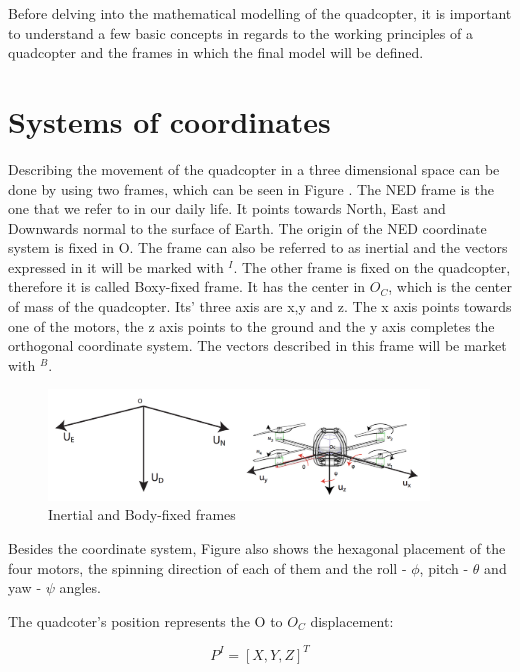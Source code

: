 Before delving into the mathematical modelling of the quadcopter, it is important to understand a few basic concepts in regards to the working principles of a quadcopter and the frames in which the final model will be defined.

\section{Systems of coordinates} \label{2.1} 
Describing the movement of the quadcopter in a three dimensional space can be done by using two frames, which can be seen in Figure \label{frames1}. The NED frame is the one that we refer to in our daily life. It points towards North, East and Downwards normal to the surface of Earth. The origin of the NED coordinate system is fixed in O. The frame can also be referred to as inertial and the vectors expressed in it will be marked with $^{I}$. The other frame is fixed on the quadcopter, therefore it is called Boxy-fixed frame. It has the center in $O_{C}$, which is the center of mass of the quadcopter. Its' three axis are x,y and z. The x axis points towards one of the motors, the z axis points to the ground and the y axis completes the orthogonal coordinate system. The vectors described in this frame will be market with $^{B}$. 


\begin{figure}[H]
  \centering
    \includegraphics[width=0.9\textwidth]{images/frames1.png}
	\caption{Inertial and Body-fixed frames}
	\label{frames1}
\end{figure}

Besides the coordinate system, Figure \label{frames1} also shows the hexagonal placement of the four motors, the spinning direction of each of them and the roll - $\phi$, pitch - $\theta$ and yaw - $\psi$ angles. 

The quadcoter's position represents the O to $O_{C}$ displacement:

\begin{equation}
	P^{I}=[X, Y, Z] ^{T}
\end{equation} 

